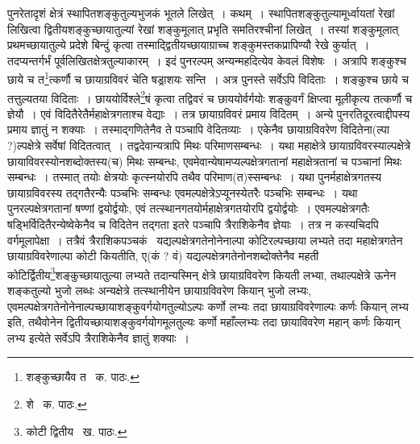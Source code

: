 \documentclass[11pt, openany]{book}
\begin{document}
\noindent पुनरेतादृशं क्षेत्रं स्थापितशङ्कुतुल्यभुजकं भूतले लिखेत्~। कथम्~। स्थापितशङ्कुतुल्यामूर्ध्वायतां रेखां लिखित्वा द्वितीयशङ्कुच्छायातुल्यां रेखां शङ्कुमूलात् प्रभृति समतिरश्चीनां लिखेत्~। तस्यां शङ्कुमूलात् प्रथमच्छायातुल्ये प्रदेशे बिन्दुं कृत्वा तस्माद्द्वितीयच्छायाग्राच्च शङ्कुमस्तकप्रापिण्यौ रेखे
कुर्यात्~। तदप्यन्तर्गर्भं पूर्वलिखितक्षेत्रतुल्याकारम्~। इदं पुनरल्पम् अन्यन्महदित्येव केवलं विशेषः~। अत्रापि शङ्कुश्च छाये च त\renewcommand{\thefootnote}{१}\footnote{शङ्कुच्छायैव त \textendash\ क. पाठः.}त्कर्णौ च छायाग्रविवरं चेति षड्राशयः सन्ति~। अत्र पुनस्ते सर्वेऽपि विदिताः~। शङ्कुश्च छाये च तत्तुल्यतया विदिताः~। छाययोर्विश्ले\renewcommand{\thefootnote}{२}\footnote{शे \textendash\ क. पाठः.}षं कृत्वा तद्विवरं च छाययोर्वर्गयोः शङ्कुवर्गं क्षिप्त्वा मूलीकृत्य तत्कर्णौ च ज्ञेयौ~। एवं विदितैरेतैर्महाक्षेत्रगताश्च वेद्याः~। तत्र छायाग्रविवरं प्रमाय विदितम्~। अन्ये पुनरतिदूरत्वाद्दीपस्य प्रमाय ज्ञातुं न शक्याः~। तस्माद्गणितेनैव ते पञ्चापि वेदितव्याः~। एकेनैव छायाग्रविवरेण विदितेना(ल्पा ?)ल्पक्षेत्रे सर्वेषां विदितत्वात्~। तद्वदेवान्यत्रापि मिथः परिमाणसम्बन्धः~। यथा महाक्षेत्रे छायाग्रविवरस्याल्पक्षेत्रे छायाविवरस्योनशब्दोक्तस्य(च) मिथः सम्बन्धः,
एवमेवान्येषामप्यल्पक्षेत्रगतानां महाक्षेत्रतानां च पञ्चानां मिथः सम्बन्धः~। तस्मात् तयोः क्षेत्रयोः कृत्स्नयोरपि तथैव परिमाण(त)स्सम्बन्धः~। यथा पुनर्महाक्षेत्रगतस्य छायाग्रविवरस्य तद्गतैरन्यैः पञ्चभिः सम्बन्धः एवमल्पक्षेत्रेऽप्यूनस्येतरैः पञ्चभिः सम्बन्धः~। यथा पुनरल्पक्षेत्रगतानां षण्णां द्वयोर्द्वयोः, एवं तत्स्थानगतयोर्महाक्षेत्रगतयोरपि द्वयोर्द्वयोः~। एवमल्पक्षेत्रगतैः षड्भिर्विदितैरन्येष्वेकेनैव च विदितेन तद्गता इतरे पञ्चापि त्रैराशिकेनैव ज्ञेयाः~। तत्र न कस्यचिदपि वर्गमूलापेक्षा~। तत्रैवं त्रैराशिकपञ्चकं \textendash\ यद्यल्पक्षेत्रगतेनोनेनाल्पा कोटिरल्पच्छाया लभ्यते तदा महाक्षेत्रगतेन छायाग्रविवरेणाल्पा कोटी कियतीति, ए(कं ? वं) यद्यल्पक्षेत्रगतेनोनशब्दोक्तेनैव महती कोटिर्द्वितीय\renewcommand{\thefootnote}{३}\footnote{कोटी द्वितीय \textendash\ ख. पाठः.}शङ्कुच्छायातुल्या लभ्यते तदान्यस्मिन् क्षेत्रे छायाग्रविवरेण कियती लभ्या, तथाल्पक्षेत्रे ऊनेन शङ्कतुल्यो भुजो लब्धः अन्यक्षेत्रे तत्स्थानीयेन छायाग्रविवरेण कियान् भुजो लभ्यः, एवमल्पक्षेत्रगतेनोनेनाल्पच्छायाशङ्कुवर्गयोगतुल्योऽल्पः कर्णो लभ्यः तदा छायाग्रविवरेणाल्पः कर्णः कियान् लभ्य इति, तथैवोनेन द्वितीयच्छायाशङ्कुवर्गयोगमूलतुल्यः कर्णो महाँल्लभ्यः तदा छायाविवरेण महान् कर्णः कियान् लभ्य इत्येते सर्वेऽपि त्रैराशिकेनैव ज्ञातुं शक्याः~।

\newpage
\end{document}
